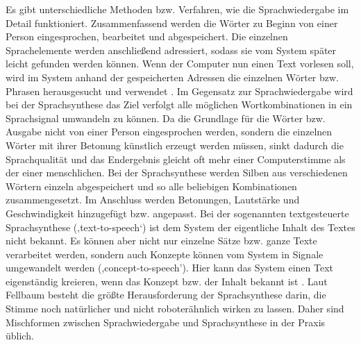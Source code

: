 \newline \newline
Es gibt unterschiedliche Methoden bzw. Verfahren, wie die Sprachwiedergabe im Detail funktioniert. Zusammenfassend werden die Wörter zu Beginn von einer Person eingesprochen, bearbeitet und abgespeichert. Die einzelnen Sprachelemente werden anschließend adressiert, sodass sie vom System später leicht gefunden werden können. Wenn der Computer nun einen Text vorlesen soll, wird im System anhand der gespeicherten Adressen die einzelnen Wörter bzw. Phrasen herausgesucht und verwendet \cite{FellbaumSprache}.
\newline \newline
Im Gegensatz zur Sprachwiedergabe wird bei der Sprachsynthese das Ziel verfolgt alle möglichen Wortkombinationen in ein Sprachsignal umwandeln zu können. Da die Grundlage für die Wörter bzw. Ausgabe nicht von einer Person eingesprochen werden, sondern die einzelnen Wörter mit ihrer Betonung künstlich erzeugt werden müssen, sinkt dadurch die Sprachqualität und das Endergebnis gleicht oft mehr einer Computerstimme als der einer menschlichen. 
\newline \newline
Bei der Sprachsynthese werden Silben aus verschiedenen Wörtern einzeln abgespeichert und so alle beliebigen Kombinationen zusammengesetzt. Im Anschluss werden Betonungen, Lautstärke und Geschwindigkeit hinzugefügt bzw. angepasst. Bei der sogenannten textgesteuerte Sprachsynthese (‚text-to-speech‘) ist dem System der eigentliche Inhalt des Textes nicht bekannt. Es können aber nicht nur einzelne Sätze bzw. ganze Texte verarbeitet werden, sondern auch Konzepte können vom System in Signale umgewandelt werden (,concept-to-speech'). Hier kann das System einen Text eigenständig kreieren, wenn das Konzept bzw. der Inhalt bekannt ist \cite{FellbaumSprache}.
\newline \newline
Laut Fellbaum \cite{FellbaumSprache} besteht die größte Herausforderung der Sprachsynthese darin, die Stimme noch natürlicher und nicht roboterähnlich wirken zu lassen. Daher sind Mischformen zwischen Sprachwiedergabe und Sprachsynthese in der Praxis üblich. 


